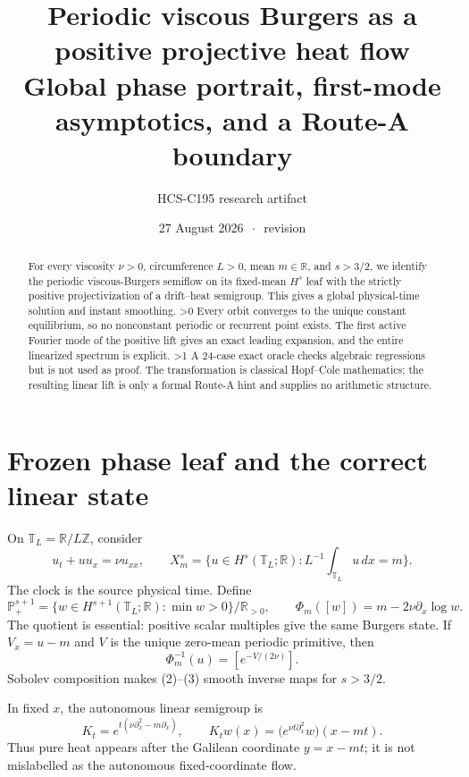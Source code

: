 \documentclass[8pt]{extarticle}
\title{\vspace{-1.8em}\textbf{Periodic viscous Burgers as a positive projective heat flow}\\[-2pt]
\large Global phase portrait, first-mode asymptotics, and a Route-A boundary}
\author{HCS-C195 research artifact}
\date{27 August 2026 \(\,\cdot\,\) revision \CRevisionRound}
\newcommand{\TT}{\mathbb T}
\newcommand{\PP}{\mathbb P}
\newcommand{\dd}{\partial}
\begin{document}
\maketitle
\vspace{-1.5em}

\begin{abstract}
For every viscosity \(\nu>0\), circumference \(L>0\), mean \(m\in\mathbb R\),
and \(s>3/2\), we identify the periodic viscous-Burgers semiflow on its
fixed-mean \(H^s\) leaf with the strictly positive projectivization of a
drift--heat semigroup. This gives a global physical-time solution and instant
smoothing.
\ifnum\CRevisionRound>0
 Every orbit converges to the unique constant equilibrium, so no nonconstant
periodic or recurrent point exists. The first active Fourier mode of the positive
lift gives an exact leading expansion, and the entire linearized spectrum is explicit.
\fi
\ifnum\CRevisionRound>1
 A 24-case exact oracle checks algebraic regressions but is not used as proof.
The transformation is classical Hopf--Cole mathematics; the resulting linear lift
is only a formal Route-A hint and supplies no arithmetic structure.
\fi
\end{abstract}

\section{Frozen phase leaf and the correct linear state}

On \(\TT_L=\mathbb R/L\mathbb Z\), consider
\[
 u_t+u u_x=\nu u_{xx},\qquad
 X_m^s=\{u\in H^s(\TT_L;\mathbb R):L^{-1}\!\int_{\TT_L}u\,dx=m\}.
\tag{1}
\]
The clock is the source physical time. Define
\[
\PP^{s+1}_+=
\{w\in H^{s+1}(\TT_L;\mathbb R):\min w>0\}/\mathbb R_{>0},
\qquad
\Phi_m([w])=m-2\nu\dd_x\log w.                                      \tag{2}
\]
The quotient is essential: positive scalar multiples give the same Burgers state.
If \(V_x=u-m\) and \(V\) is the unique zero-mean periodic primitive, then
\[
\Phi_m^{-1}(u)=[e^{-V/(2\nu)}].                                      \tag{3}
\]
Sobolev composition makes (2)--(3) smooth inverse maps for \(s>3/2\).

In fixed \(x\), the autonomous linear semigroup is
\[
K_t=e^{t(\nu\dd_x^2-m\dd_x)},\qquad
K_tw(x)=\bigl(e^{\nu t\dd_x^2}w\bigr)(x-mt).                          \tag{4}
\]
Thus pure heat appears after the Galilean coordinate \(y=x-mt\); it is not
mislabelled as the autonomous fixed-coordinate flow.
\end{document}
